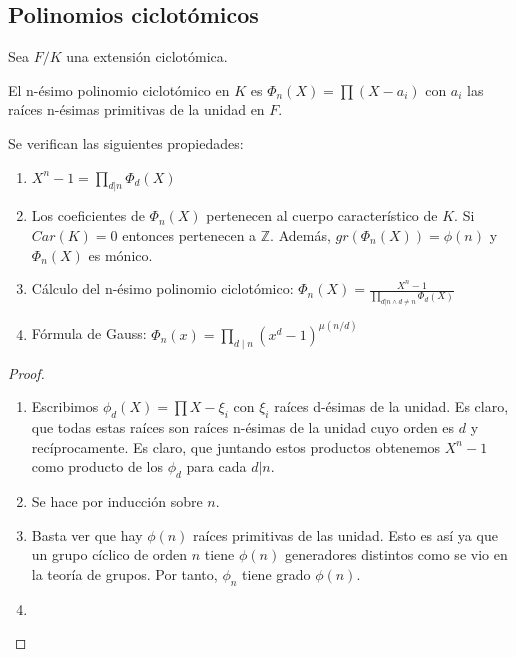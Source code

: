 \subsection{Polinomios ciclotómicos}

\begin{definition}
Sea $F/K$ una extensión ciclotómica. 

El n-ésimo polinomio ciclotómico en $K$ es $\Phi_n(X) = \prod (X-a_i)$ con $a_i$ las raíces n-ésimas primitivas de la unidad en $F$. 
\end{definition}

\begin{proposition}
Se verifican las siguientes propiedades:

\begin{enumerate}
\item $X^n - 1 = \prod_{d|n} \Phi_d(X)$
\item Los coeficientes de $\Phi_n(X)$ pertenecen al cuerpo característico de $K$. Si $Car(K) = 0$ entonces pertenecen a $\mathbb{Z}$. Además, $gr(\Phi_n(X)) = \phi(n)$ y $\Phi_n(X)$ es mónico. 
\item Cálculo del n-ésimo polinomio ciclotómico: $\Phi_n(X) = \frac{X^n - 1}{\prod_{d|n \land d \neq n} \Phi_d(X)}$ 
\item Fórmula de Gauss: 
$\Phi_n(x) = \prod_{d\mid n} (x^{d}-1)^{\mu(n/d)}$
\end{enumerate}
\end{proposition}
\begin{proof}
\begin{enumerate}
\item Escribimos $\phi_d(X) = \prod X-\xi_i$ con $\xi_i$ raíces d-ésimas de la unidad. Es claro, que todas estas raíces son raíces n-ésimas de la unidad cuyo orden es $d$ y recíprocamente. Es claro, que juntando estos productos obtenemos $X^n - 1$ como producto de los $\phi_d$ para cada $d|n$. 

\item Se hace por inducción sobre $n$.
  
\item Basta ver que hay $\phi(n)$ raíces primitivas de las unidad. Esto es así ya que un grupo cíclico de orden $n$ tiene $\phi(n)$ generadores distintos como se vio en la teoría de grupos. Por tanto, $\phi_n$ tiene grado $\phi(n)$. 

\item  
\end{enumerate}
\end{proof}

